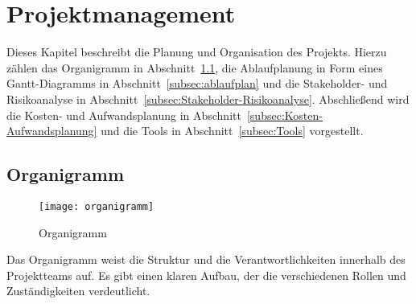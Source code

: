 \section{Projektmanagement}\label{sec:projektmanagement}

Dieses Kapitel beschreibt die Planung und Organisation des Projekts.
Hierzu zählen das Organigramm in Abschnitt~\ref{subsec:Organigramm}, die Ablaufplanung in Form eines Gantt-Diagramms in Abschnitt~\ref{subsec:ablaufplan} und die Stakeholder- und Risikoanalyse in Abschnitt~\ref{subsec:Stakeholder-Risikoanalyse}.
Abschließend wird die Kosten- und Aufwandsplanung in Abschnitt~\ref{subsec:Kosten-Aufwandsplanung} und die Tools in Abschnitt~\ref{subsec:Tools} vorgestellt.

\subsection{Organigramm}\label{subsec:Organigramm}

\begin{figure}[H]
    \centering
    \texttt{[image: organigramm]}
    \caption{Organigramm}\label{fig:organigramm}
\end{figure}

Das Organigramm weist die Struktur und die Verantwortlichkeiten innerhalb des Projektteams auf.
Es gibt einen klaren Aufbau, der die verschiedenen Rollen und Zuständigkeiten verdeutlicht.

